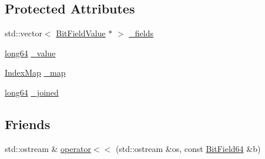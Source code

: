 \subsection*{Protected Attributes}
\begin{DoxyCompactItemize}
\item 
std\+::vector$<$ \hyperlink{class_d_d4hep_1_1_d_d_segmentation_1_1_bit_field_value}{Bit\+Field\+Value} $\ast$ $>$ \hyperlink{class_d_d4hep_1_1_d_d_segmentation_1_1_bit_field64_a1a8739ee82ff112b34aee61feb39cda3}{\+\_\+fields}
\item 
\hyperlink{namespace_d_d4hep_ac2a70e722b33dc7ddaa20db8954ac836}{long64} \hyperlink{class_d_d4hep_1_1_d_d_segmentation_1_1_bit_field64_a5c784ab1cd7dcd334b3a06cd1ce496f4}{\+\_\+value}
\item 
\hyperlink{class_d_d4hep_1_1_d_d_segmentation_1_1_bit_field64_a332cc613098802352470f92c7a7c71fd}{Index\+Map} \hyperlink{class_d_d4hep_1_1_d_d_segmentation_1_1_bit_field64_a0bf8be0d75f49e529d583f4025a6b23c}{\+\_\+map}
\item 
\hyperlink{namespace_d_d4hep_ac2a70e722b33dc7ddaa20db8954ac836}{long64} \hyperlink{class_d_d4hep_1_1_d_d_segmentation_1_1_bit_field64_afbef9d9ffa1944254144159c518fc227}{\+\_\+joined}
\end{DoxyCompactItemize}
\subsection*{Friends}
\begin{DoxyCompactItemize}
\item 
std\+::ostream \& \hyperlink{class_d_d4hep_1_1_d_d_segmentation_1_1_bit_field64_a6d781e0764c4c38ae618a3431af85e4e}{operator$<$$<$} (std\+::ostream \&os, const \hyperlink{class_d_d4hep_1_1_d_d_segmentation_1_1_bit_field64}{Bit\+Field64} \&b)
\end{DoxyCompactItemize}


